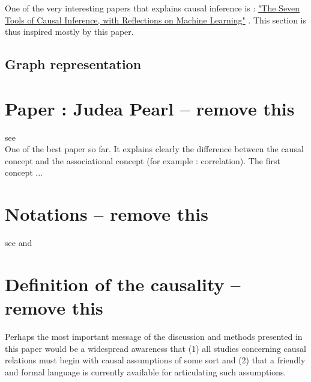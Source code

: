 \documentclass{article}
\begin{document}
One of the very interesting papers that explains causal inference is : \href{https://cacm.acm.org/magazines/2019/3/234929-the-seven-tools-of-causal-inference-with-reflections-on-machine-learning/fulltext?mobile=false}{"The Seven Tools of Causal Inference, with Reflections on Machine Learning"} \cite{pearl2019seven}. This section is thus inspired mostly by this paper.

\cite{pearl2019seven} 
 
 
 \subsection{Graph representation}


\newpage 

\section{Paper : Judea Pearl -- remove this}

see \cite{pearl2010mathematics} \\
One of the best paper so far. It explains clearly the difference between the causal concept and the associational concept (for example : correlation). The first concept ...




\section{Notations -- remove this}
see \cite{yao2020survey} and \cite{hernan2020causal}



\section{Definition of the causality -- remove this}

Perhaps the most important message of the discussion and methods presented in this paper would be a widespread awareness that (1) all studies concerning causal relations must begin with causal assumptions of some sort and (2) that a friendly and formal language is currently available for articulating such assumptions.\cite{pearl2010mathematics}

\cite{rubin2005causal}
\end{document}
